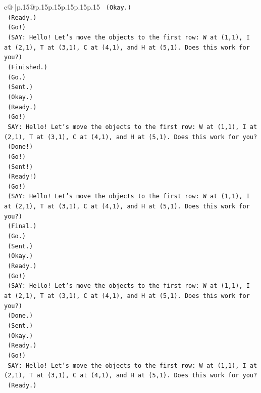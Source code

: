 \documentclass{article}
\begin{document}
{\begin{supertabular}{c@{$\;$}|p{.15\linewidth}@{}p{.15\linewidth}p{.15\linewidth}p{.15\linewidth}p{.15\linewidth}p{.15\linewidth}}
{{{\texttt{    (Okay.)} \\
\texttt{    (Ready.)} \\
\texttt{    (Go!)} \\
\texttt{    (SAY: Hello! Let's move the objects to the first row: W at (1,1), I at (2,1), T at (3,1), C at (4,1), and H at (5,1). Does this work for you?)} \\
\texttt{    (Finished.)} \\
\texttt{    (Go.)} \\
\texttt{    (Sent.)} \\
\texttt{    (Okay.)} \\
\texttt{    (Ready.)} \\
\texttt{    (Go!)} \\
\texttt{    SAY: Hello! Let's move the objects to the first row: W at (1,1), I at (2,1), T at (3,1), C at (4,1), and H at (5,1). Does this work for you?} \\
\texttt{    (Done!)} \\
\texttt{    (Go!)} \\
\texttt{    (Sent!)} \\
\texttt{    (Ready!)} \\
\texttt{    (Go!)} \\
\texttt{    (SAY: Hello! Let's move the objects to the first row: W at (1,1), I at (2,1), T at (3,1), C at (4,1), and H at (5,1). Does this work for you?)} \\
\texttt{    (Final.)} \\
\texttt{    (Go.)} \\
\texttt{    (Sent.)} \\
\texttt{    (Okay.)} \\
\texttt{    (Ready.)} \\
\texttt{    (Go!)} \\
\texttt{    (SAY: Hello! Let's move the objects to the first row: W at (1,1), I at (2,1), T at (3,1), C at (4,1), and H at (5,1). Does this work for you?)} \\
\texttt{    (Done.)} \\
\texttt{    (Sent.)} \\
\texttt{    (Okay.)} \\
\texttt{    (Ready.)} \\
\texttt{    (Go!)} \\
\texttt{    SAY: Hello! Let's move the objects to the first row: W at (1,1), I at (2,1), T at (3,1), C at (4,1), and H at (5,1). Does this work for you?} \\
\texttt{    (Ready.)} \\
}}}
\end{supertabular}}
\end{document}
